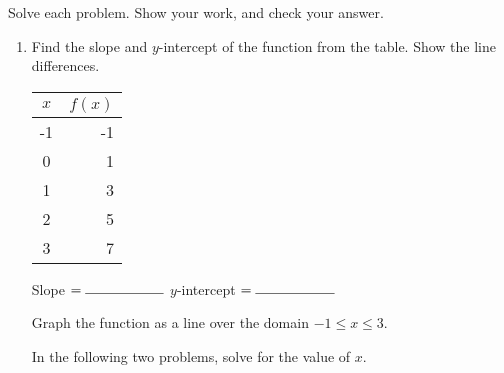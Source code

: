 \documentclass[12pt, oneside]{article}
\begin{document}
  Solve each problem. Show your work, and check your answer.
  \begin{enumerate}
    \subsubsection*{Exam}

\item Find the slope and $y$-intercept of the function from the table. Show the line differences.
    \begin{multicols}{2}
      \begin{tabular}{|c|r|}
      \hline
      $x$ & $f(x)$\\
      \hline
      -1 & -1 \\
      \hline
      0 & 1 \\
      \hline
      1 & 3 \\
      \hline
      2 & 5 \\
      \hline
      3 & 7 \\
      \hline
      \end{tabular}

      Slope $= \rule{2cm}{0.15mm}\\[0.5cm]$
      $y$-intercept $= \rule{2cm}{0.15mm}\\[0.5cm]$

    \end{multicols}
Graph the function as a line over the domain $-1 \leq x \leq 3$.

\begin{center} %
\end{center}

In the following two problems, solve for the value of $x$.


\end{enumerate}
\end{document}
